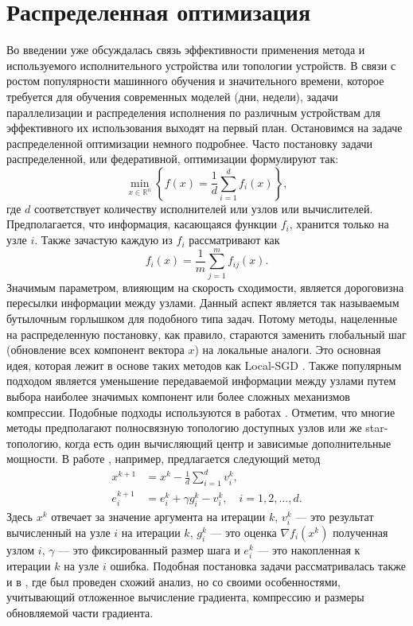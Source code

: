 \section{Распределенная оптимизация} \label{raspr}
  Во введении уже обсуждалась связь эффективности применения метода и используемого исполнительного устройства или топологии устройств. В связи с ростом популярности машинного обучения и значительного времени, которое требуется для обучения современных моделей (дни, недели), задачи параллелизации и распределения исполнения по различным устройствам для эффективного их использования выходят на первый план. Остановимся на задаче распределенной оптимизации немного подробнее. Часто постановку задачи распределенной, или федеративной, оптимизации формулируют так:
  \begin{equation} \label{raspr_task}
    \min_{x \in \mathbb{R}^n}\left\{f(x)=\frac{1}{d} \sum_{i=1}^d f_i(x)\right\},
  \end{equation}
  где $d$ соответствует количеству исполнителей или узлов или вычислителей. Предполагается, что информация, касающаяся функции $f_i$, хранится только на узле $i$. Также зачастую каждую из $f_i$ рассматривают как
  $$
    f_i(x) = \frac{1}{m} \sum_{j=1}^m f_{ij}(x).
  $$ 
  Значимым параметром, влияющим на скорость сходимости, является дороговизна пересылки информации между узлами. Данный аспект является так называемым бутылочным горлышком для подобного типа задач. Потому методы, нацеленные на распределенную постановку, как правило, стараются заменить глобальный шаг (обновление всех компонент вектора $x$) на локальные аналоги. Это основная идея, которая лежит в основе таких методов как Local-SGD \cite{Stich2019LocalSC}. Также популярным подходом является уменьшение передаваемой информации между узлами путем выбора наиболее значимых компонент или более сложных механизмов компрессии. Подобные подходы используются в работах \cite{qlsgd, qsgd, err_fdbk}. Отметим, что многие методы предполагают полносвязную топологию доступных узлов или же star-топологию, когда есть один вычисляющий центр и зависимые дополнительные мощности. 
  В работе \cite{GorbunovKMR20}, например, предлагается следующий метод
  $$
  \begin{aligned} 
    x^{k+1} &=x^k-\frac{1}{d} \sum_{i=1}^d v_i^k, \\ 
    e_i^{k+1} &=e_i^k + \gamma g_i^k - v_i^k, \quad i=1,2, \ldots, d . 
  \end{aligned}
  $$
  Здесь $x^k$ отвечает за значение аргумента на итерации $k$, $v_i^k$ --- это результат вычисленный на узле $i$ на итерации $k$, $g_i^k$ --- это оценка $\nabla f_i(x^k)$ полученная узлом $i$, $\gamma$ --- это фиксированный размер шага и $e_i^k$ --- это накопленная к итерации $k$ на узле $i$ ошибка.  Подобная постановка задачи рассматривалась также и в \cite{err_fdbk}, где был проведен схожий анализ, но со своими особенностями, учитывающий отложенное вычисление градиента, компрессию и размеры обновляемой части градиента.
